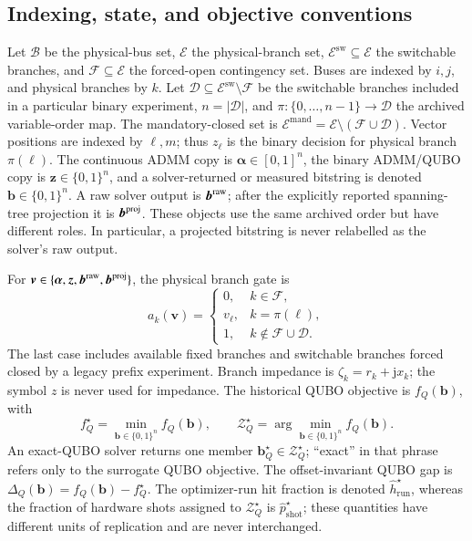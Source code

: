 \documentclass[5p,twocolumn,number,sort&compress,nopreprintline]{elsarticle}
\begin{document}
\subsection{Indexing, state, and objective conventions}
\label{sec:notation}
Let $\mathcal B$ be the physical-bus set, $\mathcal E$ the
physical-branch set, $\mathcal E^{\mathrm{sw}}\subseteq\mathcal E$
the switchable branches, and $\mathcal F\subseteq\mathcal E$ the
forced-open contingency set. Buses are indexed by $i,j$, and physical
branches by $k$. Let
$\mathcal D\subseteq\mathcal E^{\mathrm{sw}}\setminus\mathcal F$ be
the switchable branches included in a particular binary experiment,
$n=|\mathcal D|$, and
$\pi:\{0,\ldots,n-1\}\to\mathcal D$ the archived variable-order map.
The mandatory-closed set is
$\mathcal E^{\mathrm{mand}}=\mathcal E\setminus
(\mathcal F\cup\mathcal D)$.
Vector positions are indexed by $\ell,m$; thus $z_\ell$ is the binary
decision for physical branch $\pi(\ell)$. The continuous ADMM copy is
$\boldsymbol\alpha\in[0,1]^n$, the binary ADMM/QUBO copy is
$\boldsymbol z\in\{0,1\}^n$, and a solver-returned or measured bitstring
is denoted $\boldsymbol b\in\{0,1\}^n$. A raw solver output is
$\boldsymbol b^{\rm raw}$; after the explicitly reported spanning-tree
projection it is $\boldsymbol b^{\rm proj}$. These objects use the same
archived order but have different roles. In particular, a projected
bitstring is never relabelled as the solver's raw output.

For $\boldsymbol v\in\{\boldsymbol\alpha,\boldsymbol z,
\boldsymbol b^{\rm raw},\boldsymbol b^{\rm proj}\}$, the physical branch
gate is
\begin{equation}\label{eq:physical-gate-map}
a_k(\boldsymbol v)=
\begin{cases}
0, & k\in\mathcal F,\\
v_\ell, & k=\pi(\ell),\\
1, & k\notin\mathcal F\cup\mathcal D.
\end{cases}
\end{equation}
The last case includes available fixed branches and switchable branches
forced closed by a legacy prefix experiment. Branch impedance is
$\zeta_k=r_k+\mathrm jx_k$; the symbol $z$ is never used for impedance.
The historical QUBO objective is $f_Q(\boldsymbol b)$, with
\begin{equation}
 f_Q^\star=\min_{\boldsymbol b\in\{0,1\}^n}f_Q(\boldsymbol b),
 \qquad
 \mathcal Z_Q^\star=\arg\min_{\boldsymbol b\in\{0,1\}^n}
 f_Q(\boldsymbol b).
\end{equation}
An exact-QUBO solver returns one member
$\boldsymbol b_Q^\star\in\mathcal Z_Q^\star$; ``exact'' in that phrase
refers only to the surrogate QUBO objective. The offset-invariant QUBO
gap is
$\Delta_Q(\boldsymbol b)=f_Q(\boldsymbol b)-f_Q^\star$.
The optimizer-run hit fraction is denoted
$\widehat h_{\mathrm{run}}^\star$, whereas the fraction of hardware
shots assigned to $\mathcal Z_Q^\star$ is
$\widehat p_{\mathrm{shot}}^\star$; these quantities have different
units of replication and are never interchanged.
\end{document}
